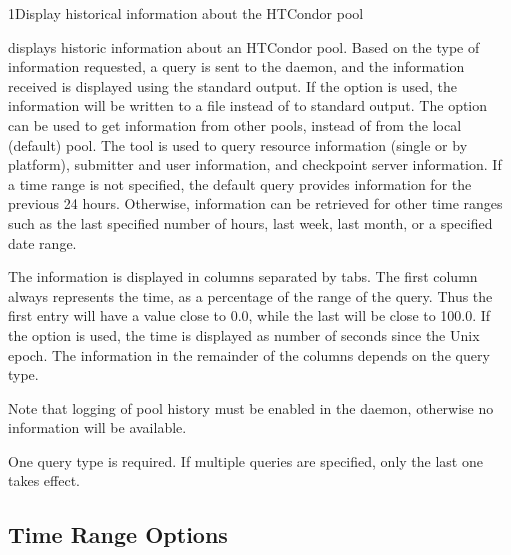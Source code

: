 \begin{ManPage}{}{1}{Display historical information about the HTCondor pool}
\label{man-condor-stats}
\Synopsis {}


\Description
{} displays historic information about an HTCondor pool.
Based on the type of information requested,
a query is sent to the  daemon,
and the information received is displayed using the standard output.
If the  option is used,
the information will be written to a file instead of
to standard output.
The  option can be used to get information from 
other pools, instead of from the local (default) pool.
The  tool is used to query resource 
information (single or by platform),
submitter and user information,
and checkpoint server information.
If a time range is not specified,
the default query provides information for the previous 24 hours.
Otherwise, information can be retrieved for other time ranges such as the last
specified number of hours, last week, last month, or a specified date range.

The information is displayed in columns separated by tabs.
The first column always represents the time,
as a percentage of the range of the query.
Thus the first entry will have a value close to 0.0,
while the last will be close to 100.0.
If the  option is used,
the time is displayed as number of seconds
since the Unix epoch.
The information in the remainder of the columns depends on the query type.

Note that logging of pool history must be enabled in the 
daemon, otherwise
no information will be available.

One query type is required.
If multiple queries are specified, only the last one takes effect.

\subsection*{Time Range Options}
\par
\begin{description}
\end{description}
\par


\end{ManPage}
